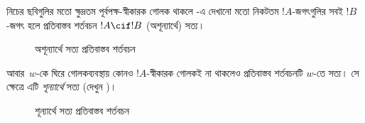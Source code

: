 \documentclass[../../../include/open-logic-section]{subfiles}
\begin{document}


নিচের ছবিগুলির মতো ক্ষুদ্রতম পূর্বপক্ষ-স্বীকারক গোলক থাকলে
-এ দেখানো মতো নিকটতম $!A$-জগৎগুলির সবই
$!B$-জগৎ হলে প্রতিবাস্তব শর্তবচন $!A \cif !B$
(অশূন্যার্থে) সত্য।
\begin{figure}
\begin{center}
\caption{অশূন্যার্থে সত্য প্রতিবাস্তব শর্তবচন}
\end{center}
\end{figure}
আবার~$w$-কে ঘিরে গোলকব্যবস্থায় কোনও $!A$-স্বীকারক গোলকই
না থাকলেও প্রতিবাস্তব শর্তবচনটি $w$-তে সত্য। সে ক্ষেত্রে
এটি \emph{শূন্যার্থে} সত্য (দেখুন )।
\begin{figure}
\begin{center}
\caption{শূন্যার্থে সত্য প্রতিবাস্তব শর্তবচন}
\end{center}
\end{figure}
\end{document}
